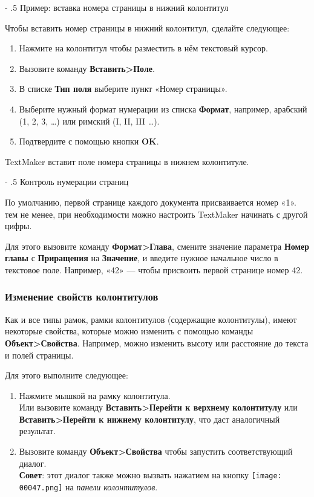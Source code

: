 \documentclass[a4paper,10pt]{article}
\makeatletter
\renewcommand\paragraph{%
   \@startsection{paragraph}{4}{0mm}%
      {-\baselineskip}%
      {.5\baselineskip}%
      {\normalfont\normalsize\bfseries}}
\makeatother
\begin{document}
\paragraph{Пример: вставка номера страницы в нижний колонтитул}

Чтобы вставить номер страницы в нижний колонтитул, сделайте следующее:
\begin{enumerate}
 \item Нажмите на колонтитул чтобы разместить в нём текстовый курсор.
 \item Вызовите команду \textbf{Вставить>Поле}.
 \item В списке \textbf{Тип поля} выберите пункт «Номер страницы».
 \item Выберите нужный формат нумерации из списка \textbf{Формат}, например, арабский (1, 2, 3, …) или римский (I, II, III …).
 \item Подтвердите с помощью кнопки \textbf{OK}.
\end{enumerate}

TextMaker вставит поле номера страницы в нижнем колонтитуле.

\paragraph{Контроль нумерации страниц}

По умолчанию, первой странице каждого документа присваивается номер «1». тем не менее, при необходимости можно настроить TextMaker начинать с другой цифры.

Для этого вызовите команду \textbf{Формат>Глава}, смените значение параметра \textbf{Номер главы} с \textbf{Приращения} на \textbf{Значение}, и введите нужное начальное число в текстовое поле. Например, «42» --- чтобы присвоить первой странице номер 42.

\subsubsection{Изменение свойств колонтитулов}
Как и все типы рамок, рамки колонтитулов (содержащие колонтитулы), имеют некоторые свойства, которые можно изменить с помощью команды \textbf{Объект>Свойства}. Например, можно изменить высоту или расстояние до текста и полей страницы.

Для этого выполните следующее:

\begin{enumerate}
 \item Нажмите мышкой на рамку колонтитула.\\
 Или вызовите команду \textbf{Вставить>Перейти к верхнему колонтитулу} или \textbf{Вставить>Перейти к нижнему колонтитулу}, что даст аналогичный результат.
 \item Вызовите команду \textbf{Объект>Свойства} чтобы запустить соответствующий диалог.\\ 
 \textbf{Совет}: этот диалог также можно вызвать нажатием на кнопку \texttt{[image: 00047.png]} на \textit{панели колонтитулов}.
\end{enumerate}
\end{document}

